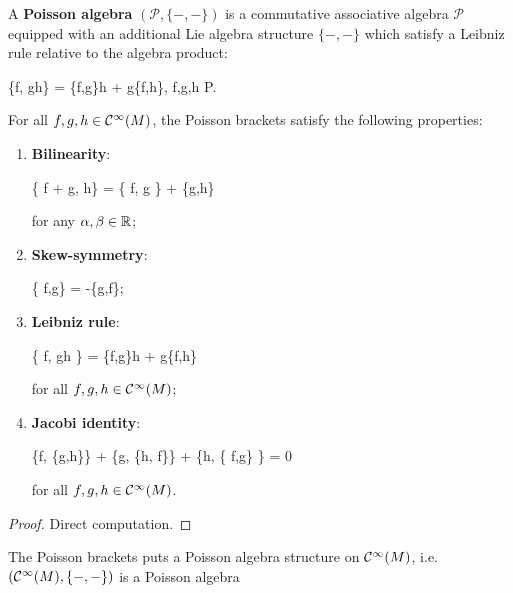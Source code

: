 \documentclass[main.tex]{subfiles}
\begin{document}
\begin{definition}
	A \textbf{Poisson algebra} $(\mathcal P, \{-,-\})$ is a commutative associative algebra $\mathcal P$ equipped with an additional Lie algebra structure $\{-,-\}$ which satisfy a Leibniz rule relative to the algebra product:
	\begin{eqalign}
		\{f, gh\} = \{f,g\}h + g\{f,h\}, \quad \forall f,g,h \in \mathcal P.
	\end{eqalign}
\end{definition}

\begin{theorem}
	For all $f,g,h \in \mathcal{C}^\infty(M)$, the Poisson brackets satisfy the following properties:
	\begin{enumerate}
		\item \textbf{Bilinearity}:
		\begin{eqalign}
			\{ \alpha f + \beta g, h\} = \alpha \{ f, g \} + \beta \{g,h\}
		\end{eqalign}
		for any $\alpha, \beta \in \mathbb{R}$;
		\item \textbf{Skew-symmetry}:
		\begin{eqalign}
			\{ f,g\} = -\{g,f\};
		\end{eqalign}
		\item \textbf{Leibniz rule}:
		\begin{eqalign}
			\{ f, gh \} = \{f,g\}h + g\{f,h\}
		\end{eqalign}
		for all $f,g,h \in \mathcal{C}^\infty(M)$;
		\item \textbf{Jacobi identity}:
		\begin{eqalign}
			\{f, \{g,h\}\} + \{g, \{h, f\}\} + \{h, \{ f,g\} \} = 0
		\end{eqalign}
		for all $f,g,h \in \mathcal{C}^\infty(M)$.
	\end{enumerate}
\end{theorem}
\begin{proof}
Direct computation.
\end{proof}

\begin{corollary}
	The Poisson brackets puts a Poisson algebra structure on $\mathcal{C}^\infty(M)$, i.e. $(\mathcal{C}^\infty(M), \{ - , -\})$ is a Poisson algebra
\end{corollary}
\end{document}
